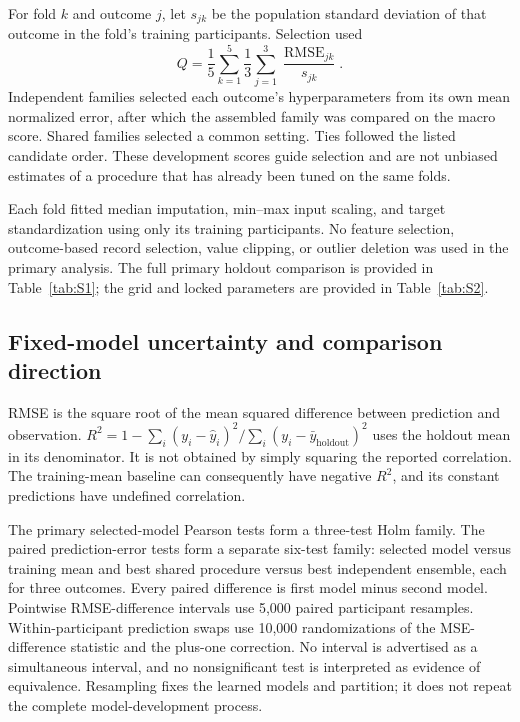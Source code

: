 For fold $k$ and outcome $j$, let $s_{jk}$ be the population standard deviation of that outcome in the fold's training participants. Selection used
\[
Q=\frac{1}{5}\sum_{k=1}^{5}\frac{1}{3}\sum_{j=1}^{3}
\frac{\operatorname{RMSE}_{jk}}{s_{jk}}.
\]
Independent families selected each outcome's hyperparameters from its own mean normalized error, after which the assembled family was compared on the macro score. Shared families selected a common setting. Ties followed the listed candidate order. These development scores guide selection and are not unbiased estimates of a procedure that has already been tuned on the same folds.

Each fold fitted median imputation, min--max input scaling, and target standardization using only its training participants. No feature selection, outcome-based record selection, value clipping, or outlier deletion was used in the primary analysis. The full primary holdout comparison is provided in Table~\ref{tab:S1}; the grid and locked parameters are provided in Table~\ref{tab:S2}.

\clearpage



\subsection{Fixed-model uncertainty and comparison direction}
RMSE is the square root of the mean squared difference between prediction and observation. $R^2=1-\sum_i(y_i-\hat y_i)^2/\sum_i(y_i-\bar y_{\mathrm{holdout}})^2$ uses the holdout mean in its denominator. It is not obtained by simply squaring the reported correlation. The training-mean baseline can consequently have negative $R^2$, and its constant predictions have undefined correlation.

The primary selected-model Pearson tests form a three-test Holm family. The paired prediction-error tests form a separate six-test family: selected model versus training mean and best shared procedure versus best independent ensemble, each for three outcomes. Every paired difference is first model minus second model. Pointwise RMSE-difference intervals use 5,000 paired participant resamples. Within-participant prediction swaps use 10,000 randomizations of the MSE-difference statistic and the plus-one correction. No interval is advertised as a simultaneous interval, and no nonsignificant test is interpreted as evidence of equivalence. Resampling fixes the learned models and partition; it does not repeat the complete model-development process.

